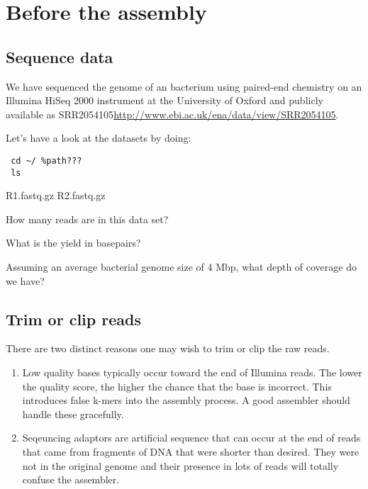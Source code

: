 
\section{Before the assembly}
\subsection{Sequence data}
We have sequenced the genome of an bacterium using paired-end chemistry on 
an Illumina HiSeq 2000 instrument at the University of Oxford and publicly available as SRR2054105\url{http://www.ebi.ac.uk/ena/data/view/SRR2054105}.

\begin{steps}
Let's have a look at the datasets by doing:
\begin{lstlisting}
 cd ~/ %path???
 ls
\end{lstlisting}
 R1.fastq.gz
 R2.fastq.gz
\end{steps}


\begin{questions}
How many reads are in this data set?
\begin{answer}
\end{answer}
What is the yield in basepairs?
\begin{answer}
\end{answer}
Assuming an average bacterial genome size of 4 Mbp, what depth of coverage do we have?
\begin{answer}
\end{answer}

\end{questions}



\subsection{Trim or clip reads}

There are two distinct reasons one may wish to trim or clip the raw reads.
\begin{enumerate}
\item Low quality bases typically occur toward the end of Illumina reads. The lower the quality score, the higher the chance that the base is incorrect. 
This introduces false k-mers into the assembly process. A good assembler should handle these gracefully.
\item Seqeuncing adaptors are artificial sequence that can occur at the end of reads that came from fragments of DNA that were shorter than desired. 
They were not in the original genome and their presence in lots of reads will totally confuse the assembler.
\end{enumerate}

